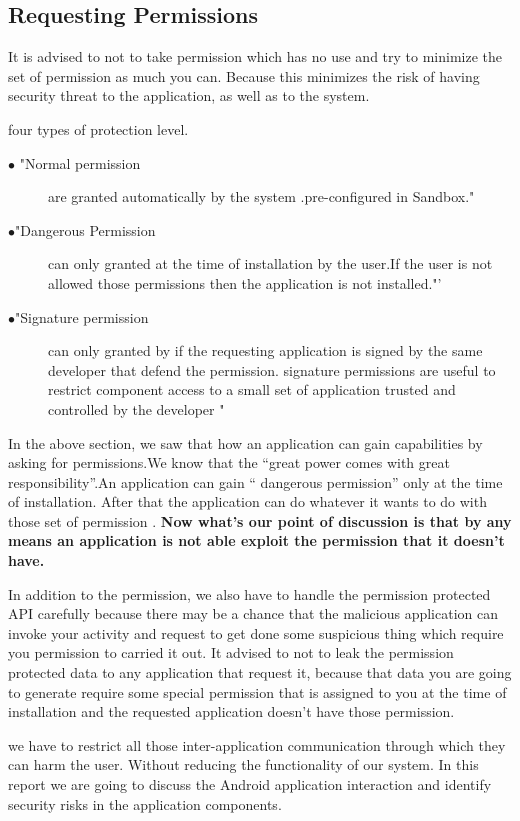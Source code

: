 \documentclass[11pt]{report}
\begin{document}
\subsection{Requesting Permissions}
It is advised to not to take permission which has no use and try to minimize the set of permission as much you can. Because this minimizes the risk of having security threat to the application, as well as to the system.
\par
four types of protection level.
\begin{description}
 \item[$\bullet$ "Normal permission] are granted automatically by the system .pre-configured in Sandbox."\cite{analyZING}
 \item[$\bullet$"Dangerous Permission]can only granted at the time of installation by the user.If the user is not allowed those permissions then the application is not installed."\cite{analyZING}'
 \item[$\bullet$"Signature permission]can only granted by if the requesting application is signed by the same developer that defend the permission. 
 signature permissions are useful to restrict  component access to a small set of application trusted and controlled by the developer  "\cite{analyZING}
\end{description}
In the above section, we saw that how an application can gain capabilities by asking for permissions.We know that the “great power comes with great responsibility”.An application can gain
“ dangerous permission” only at the time of installation. After that the application can do whatever it wants to do with those set of permission . 
\textbf{Now what's our point of discussion is that by any means an application is not able exploit the permission that it doesn't have.}
\par
In addition to the permission, we also have to handle the permission protected API carefully because there may be a chance that the malicious application 
can invoke your activity and request to get done some suspicious thing which require you permission to carried it out. It advised to not to leak the permission protected data to any application that request it,
because that data you are going to generate require some special permission that is assigned to you at the time of installation and the requested application doesn't have those permission.
\par
 we have to restrict all those  inter-application communication through which they can harm the user. Without reducing the functionality of our system.
 In this report we are going to discuss the Android application interaction and identify security risks in the application components.\par
\end{document}
